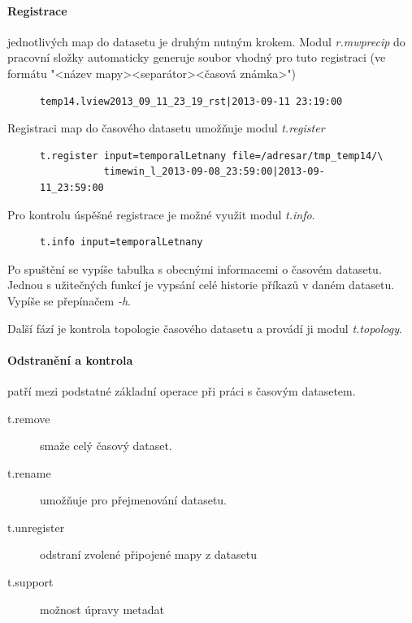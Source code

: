 \documentclass[a4paper,12pt,oneside]{report}
\begin{document}
\paragraph*{Registrace} jednotlivých map do datasetu je druhým nutným krokem. Modul \textit{r.mwprecip} do pracovní složky automaticky generuje soubor vhodný pro tuto registraci (ve formátu "<název mapy><separátor><časová známka>")
\begin{figure}[h!]
\begin{footnotesize}
\lstset{extendedchars=false,
escapeinside=''}
\begin{lstlisting}[style=mybash]
temp14.lview2013_09_11_23_19_rst|2013-09-11 23:19:00                       
\end{lstlisting}
\end{footnotesize} 
\end{figure}

Registraci map do časového datasetu umožňuje modul \textit{t.register}
\begin{figure}[h!]
\begin{footnotesize}
\lstset{extendedchars=false,
escapeinside=''}
\begin{lstlisting}[style=mybash]
t.register input=temporalLetnany file=/adresar/tmp_temp14/\
           timewin_l_2013-09-08_23:59:00|2013-09-11_23:59:00        
\end{lstlisting}
\end{footnotesize} 
\end{figure}


Pro kontrolu úspěšné registrace je možné využit modul \textit{t.info}.
\begin{figure}[h!]
\begin{footnotesize}
\lstset{extendedchars=false,
escapeinside=''}
\begin{lstlisting}[style=mybash]
t.info input=temporalLetnany      
\end{lstlisting}
\end{footnotesize} 
\end{figure}
Po spuštění se vypíše tabulka s obecnými informacemi o časovém datasetu. Jednou s užitečných funkcí je vypsání celé historie příkazů v daném datasetu. Vypíše se přepínačem \emph{-h}.

Další fází je kontrola topologie časového datasetu a provádí ji  modul \textit{t.topology}.

\paragraph*{Odstranění a kontrola} patří mezi podstatné základní operace při práci s časovým datasetem.
\begin{description}
\item[t.remove] smaže celý časový dataset.  
\item[t.rename] umožňuje pro přejmenování datasetu.
\item[t.unregister] odstraní zvolené připojené mapy z datasetu
\item[t.support] možnost úpravy metadat
\end{description}
\end{document}
